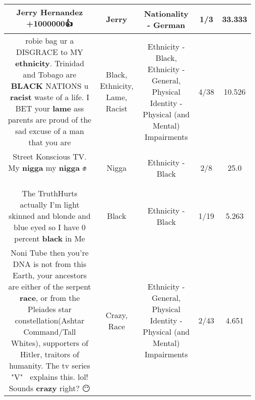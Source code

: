 \documentclass[11pt]{article}
\newlength\mylength
\begin{document}
\begin{center}
\begin{longtable}{|C{.65\mylength}|C{.30\mylength}|C{.12\mylength}|C{.12\mylength}|C{.12\mylength}|}
  \small Jerry Hernandez +1000000👍\normalsize   & Jerry & Nationality - German & 1/3 & 33.333 \\  \hline
  \small robie bag ur a DISGRACE to MY \textbf{ethnicity}. Trinidad and Tobago are \textbf{BLACK} NATIONS u \textbf{racist} waste of a  life. I BET your \textbf{lame} ass parents are proud of the sad excuse of a man that you are\normalsize   & Black, Ethnicity, Lame, Racist & Ethnicity - Black, Ethnicity - General, Physical Identity - Physical (and Mental) Impairments & 4/38 & 10.526 \\  \hline
  \small Street Konscious TV. My \textbf{nigga} my \textbf{nigga} ✊👊💪💯\normalsize   & Nigga & Ethnicity - Black & 2/8 & 25.0 \\  \hline
  \small The TruthHurts actually I'm light skinned and blonde and blue eyed so I have 0 percent \textbf{black} in Me\normalsize   & Black & Ethnicity - Black & 1/19 & 5.263 \\  \hline
  \small Noni Tube then you're DNA is not from this Earth, your ancestors are either of the serpent \textbf{race}, or from the Pleiades star constellation(Ashtar Command/Tall Whites), supporters of Hitler, traitors of humanity. The tv series "V" 🖖🐲explains this. lol! Sounds \textbf{crazy} right? 😶\normalsize   & Crazy, Race & Ethnicity - General, Physical Identity - Physical (and Mental) Impairments & 2/43 & 4.651 \\  \hline

\end{longtable}
\end{center}
\end{document}

